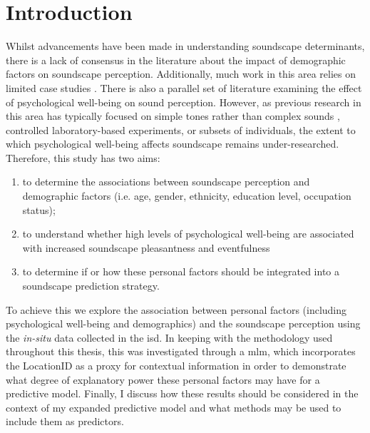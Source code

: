 \section{Introduction}

Whilst advancements have been made in understanding soundscape determinants, there is a lack of consensus in the literature about the impact of demographic factors on soundscape perception. Additionally, much work in this area relies on limited case studies \citep{Fang2021Soundscape,Ismail2014Sound,Yang2005Soundscape}. There is also a parallel set of literature examining the effect of psychological well-being on sound perception. However, as previous research in this area has typically focused on simple tones rather than complex sounds \citep{Laufer2016Behavioral,Riskind2014Influence}, controlled laboratory-based experiments, or subsets of individuals, the extent to which psychological well-being affects soundscape remains under-researched. Therefore, this study has two aims:

\begin{enumerate}
  \item to determine the associations between soundscape perception and demographic factors (i.e. age, gender, ethnicity, education level, occupation status);
  \item  to understand whether high levels of psychological well-being are associated with increased soundscape pleasantness and eventfulness
  \item to determine if or how these personal factors should be integrated into a soundscape prediction strategy.
\end{enumerate}

To achieve this we explore the association between personal factors (including psychological well-being and demographics) and the soundscape perception using the \emph{in-situ} data collected in the \gls{isd}. In keeping with the methodology used throughout this thesis, this was investigated through a \gls{mlm}, which incorporates the LocationID as a proxy for contextual information in order to demonstrate what degree of explanatory power these personal factors may have for a predictive model. Finally, I discuss how these results should be considered in the context of my expanded predictive model and what methods may be used to include them as predictors.


